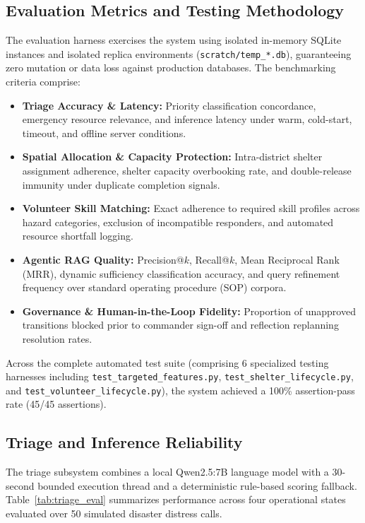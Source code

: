 \documentclass[conference]{IEEEtran}
\begin{document}
\subsection{Evaluation Metrics and Testing Methodology}
The evaluation harness exercises the system using isolated in-memory SQLite instances and isolated replica environments (\texttt{scratch/temp\_*.db}), guaranteeing zero mutation or data loss against production databases. The benchmarking criteria comprise:
\begin{itemize}
    \item \textbf{Triage Accuracy \& Latency:} Priority classification concordance, emergency resource relevance, and inference latency under warm, cold-start, timeout, and offline server conditions.
    \item \textbf{Spatial Allocation \& Capacity Protection:} Intra-district shelter assignment adherence, shelter capacity overbooking rate, and double-release immunity under duplicate completion signals.
    \item \textbf{Volunteer Skill Matching:} Exact adherence to required skill profiles across hazard categories, exclusion of incompatible responders, and automated resource shortfall logging.
    \item \textbf{Agentic RAG Quality:} Precision@$k$, Recall@$k$, Mean Reciprocal Rank (MRR), dynamic sufficiency classification accuracy, and query refinement frequency over standard operating procedure (SOP) corpora.
    \item \textbf{Governance \& Human-in-the-Loop Fidelity:} Proportion of unapproved transitions blocked prior to commander sign-off and reflection replanning resolution rates.
\end{itemize}
Across the complete automated test suite (comprising 6 specialized testing harnesses including \texttt{test\_targeted\_features.py}, \texttt{test\_shelter\_lifecycle.py}, and \texttt{test\_volunteer\_lifecycle.py}), the system achieved a 100\% assertion-pass rate (45/45 assertions).

\subsection{Triage and Inference Reliability}
The triage subsystem combines a local Qwen2.5:7B language model \cite{b7} with a 30-second bounded execution thread and a deterministic rule-based scoring fallback. Table~\ref{tab:triage_eval} summarizes performance across four operational states evaluated over 50 simulated disaster distress calls.
\end{document}
